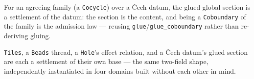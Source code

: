 \begin{theorem}\label{thm:settlement-of-cech1}\leanok{}
For an agreeing family (a \texttt{Cocycle}) over a \v{C}ech datum, the glued
global section is a settlement of the datum: the section is the content, and
being a \texttt{Coboundary} of the family is the admission law --- reusing
\texttt{glue}/\texttt{glue\_coboundary} rather than re-deriving gluing.
\end{theorem}

\begin{theorem}\label{thm:settlement-recurring-cell}\leanok{}
\texttt{Tiles}, a \texttt{Beads} thread, a \texttt{Hole}'s effect relation,
and a \v{C}ech datum's glued section are each a settlement of their own base
--- the same two-field shape, independently instantiated in four domains
built without each other in mind.
\end{theorem}
